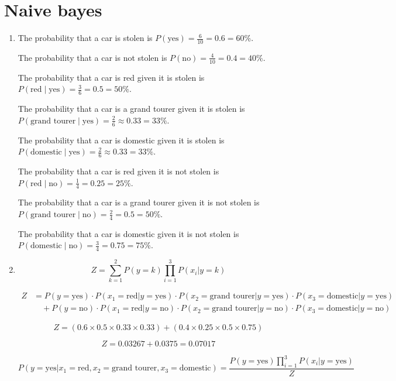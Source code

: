 \documentclass[a4paper]{article}
\begin{document}
\section{Naive bayes}
\begin{enumerate}
    \item 

The probability that a car is stolen is \( P(\text{yes}) = \frac{6}{10} = 0.6 = 60\% \).

The probability that a car is not stolen is \( P(\text{no}) = \frac{4}{10} = 0.4 = 40\% \).

The probability that a car is red given it is stolen is \( P(\text{red} \mid \text{yes}) = \frac{3}{6} = 0.5 = 50\% \).

The probability that a car is a grand tourer given it is stolen is \( P(\text{grand tourer} \mid \text{yes}) = \frac{2}{6} \approx 0.33 = 33\% \).

The probability that a car is domestic given it is stolen is \( P(\text{domestic} \mid \text{yes}) = \frac{2}{6} \approx 0.33 = 33\% \).

The probability that a car is red given it is not stolen is \( P(\text{red} \mid \text{no}) = \frac{1}{4} = 0.25 = 25\% \).

The probability that a car is a grand tourer given it is not stolen is \( P(\text{grand tourer} \mid \text{no}) = \frac{2}{4} = 0.5 = 50\% \).

The probability that a car is domestic given it is not stolen is \( P(\text{domestic} \mid \text{no}) = \frac{3}{4} = 0.75 = 75\% \).

\item 

\[
Z = \sum_{k=1}^{2} P(y = k) \prod_{i=1}^{3} P(x_i | y = k)
\]

\begin{align*}
Z &= P(y = \text{yes}) \cdot P(x_1 = \text{red} | y = \text{yes}) \cdot P(x_2 = \text{grand tourer} | y = \text{yes}) \cdot P(x_3 = \text{domestic} | y = \text{yes}) \\
&\quad + P(y = \text{no}) \cdot P(x_1 = \text{red} | y = \text{no}) \cdot P(x_2 = \text{grand tourer} | y = \text{no}) \cdot P(x_3 = \text{domestic} | y = \text{no})
\end{align*}

\[
Z = (0.6 \times 0.5 \times 0.33 \times 0.33) + (0.4 \times 0.25 \times 0.5 \times 0.75)
\]

\[
Z = 0.03267 + 0.0375 = 0.07017
\]

\[
P(y = \text{yes} | x_1 = \text{red}, x_2 = \text{grand tourer}, x_3 = \text{domestic}) = \frac{P(y = \text{yes}) \prod_{i=1}^{3} P(x_i | y = \text{yes})}{Z}
\]


\end{enumerate}
\end{document}
